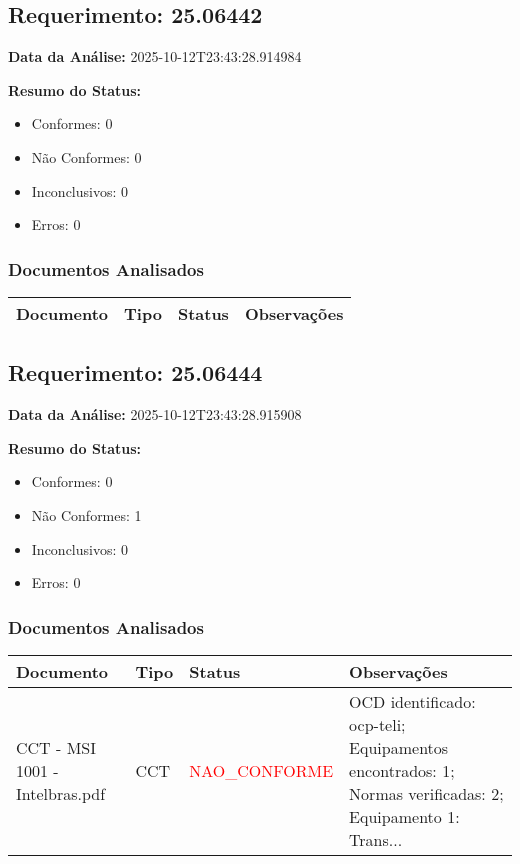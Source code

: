 \documentclass[12pt,a4paper]{article}
\begin{document}
\subsection{Requerimento: 25.06442}

\textbf{Data da Análise:} 2025-10-12T23:43:28.914984

\textbf{Resumo do Status:}
\begin{itemize}
    \item Conformes: 0
    \item Não Conformes: 0
    \item Inconclusivos: 0
    \item Erros: 0
\end{itemize}

\subsubsection{Documentos Analisados}

\begin{longtable}{|p{4cm}|p{2cm}|p{2cm}|p{6cm}|}
\hline
\textbf{Documento} & \textbf{Tipo} & \textbf{Status} & \textbf{Observações} \\
\hline
\endhead
\end{longtable}


\subsection{Requerimento: 25.06444}

\textbf{Data da Análise:} 2025-10-12T23:43:28.915908

\textbf{Resumo do Status:}
\begin{itemize}
    \item Conformes: 0
    \item Não Conformes: 1
    \item Inconclusivos: 0
    \item Erros: 0
\end{itemize}

\subsubsection{Documentos Analisados}

\begin{longtable}{|p{4cm}|p{2cm}|p{2cm}|p{6cm}|}
\hline
\textbf{Documento} & \textbf{Tipo} & \textbf{Status} & \textbf{Observações} \\
\hline
\endhead
CCT - MSI 1001 - Intelbras.pdf & CCT & \textcolor{red}{NAO\_CONFORME} & OCD identificado: ocp-teli; Equipamentos encontrados: 1; Normas verificadas: 2; Equipamento 1: Trans... \\
\hline
\end{longtable}
\end{document}
